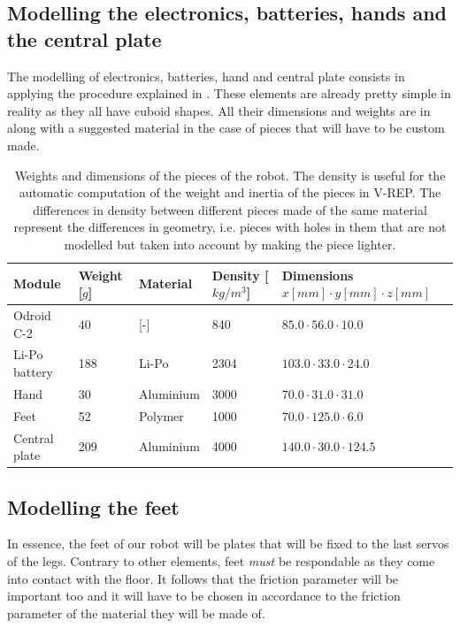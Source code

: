 \subsection{Modelling the electronics, batteries, hands and the central plate}
The modelling of electronics, batteries, hand and central plate consists in applying the procedure explained in . These elements are already pretty simple in reality as they all have cuboid shapes. All their dimensions and weights are in  along with a suggested material in the case of pieces that will have to be custom made.

\begin{table}[htp]
\centering
\begin{tabularx}{\textwidth}{@{} l l X X p{4.1cm} @{}}
\toprule
\textbf{Module} & \textbf{Weight [$g$]} & \textbf{Material} &  \textbf{Density [$kg/m^3$]}& \textbf{Dimensions $x[mm] \cdot y[mm] \cdot z[mm]$}\\ 
\midrule
Odroid C-2 & 40 & [-] & 840 & $85.0 \cdot 56.0 \cdot 10.0$\\
Li-Po battery & 188 & Li-Po & 2304 & $103.0 \cdot 33.0 \cdot 24.0$\\
Hand & 30 & Aluminium & 3000 & $70.0 \cdot 31.0 \cdot 31.0$\\
Feet & 52 & Polymer & 1000 & $70.0 \cdot 125.0 \cdot 6.0$\\
Central plate & 209 & Aluminium & 4000 & $140.0 \cdot 30.0 \cdot 124.5$\\
\bottomrule
\end{tabularx}
\caption[Weights and dimensions of the pieces of the robot]{Weights and dimensions of the pieces of the robot. The density is useful for the automatic computation of the weight and inertia of the pieces in V-REP. The differences in density between different pieces made of the same material represent the differences in geometry, i.e. pieces with holes in them that are not modelled but taken into account by making the piece lighter.}
\label{table:weights}
\end{table}

\subsection{Modelling the feet}
In essence, the feet of our robot will be plates that will be fixed to the last servos of the legs. Contrary to other elements, feet \emph{must} be respondable as they come into contact with the floor. It follows that the friction parameter will be important too and it will have to be chosen in accordance to the friction parameter of the material they will be made of.

